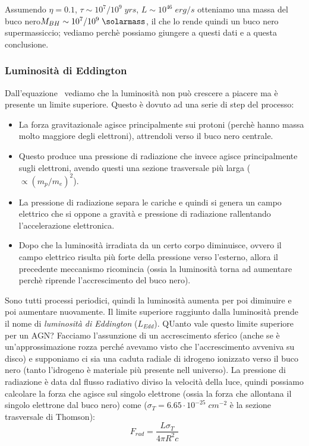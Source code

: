Assumendo $\eta = 0.1$, $\tau \sim 10^7/10^9 \;\si{yrs}$, $L \sim 10^{46} \;\si{erg}/\si{s}$ otteniamo una massa del buco nero$M_{BH} \sim 10^7/10^9 \;\si{\solarmass}$, il che lo rende quindi un buco nero supermassiccio; vediamo perchè possiamo giungere a questi dati e a questa conclusione.

\subsubsection{Luminosità di Eddington}
Dall'equazione~ vediamo che la luminosità non può crescere a piacere ma è presente un limite superiore. Questo è dovuto ad una serie di step del processo:
\begin{itemize}
    \item La forza gravitazionale agisce principalmente sui protoni (perchè hanno massa molto maggiore degli elettroni), attrendoli verso il buco nero centrale.
    \item Questo produce una pressione di radiazione che invece agisce principalmente sugli elettroni, avendo questi una sezione trasversale più larga ($\propto (m_p/m_e)^2$).
    \item La pressione di radiazione separa le cariche e quindi si genera un campo elettrico che si oppone a gravità e pressione di radiazione rallentando l'accelerazione elettronica.
    \item Dopo che la luminosità irradiata da un certo corpo diminuisce, ovvero il campo elettrico risulta più forte della pressione verso l'esterno, allora il precedente meccanismo ricomincia (ossia la luminosità torna ad aumentare perchè riprende l'accrescimento del buco nero).
\end{itemize}
Sono tutti processi periodici, quindi la luminosità aumenta per poi diminuire e poi aumentare nuovamente. Il limite superiore raggiunto dalla luminosità prende il nome di \emph{luminosità di Eddington} ($L_{Edd}$). QUanto vale questo limite superiore per un AGN? Facciamo l'assunzione di un accrescimento sferico (anche se è un’approssimazione rozza perché avevamo visto che l’accrescimento avveniva su disco) e supponiamo ci sia una caduta radiale di idrogeno ionizzato verso il buco nero (tanto l'idrogeno è materiale più presente nell universo). La pressione di radiazione è data dal flusso radiativo diviso la velocità della luce, quindi possiamo calcolare la forza che agisce sul singolo elettrone (ossia la forza che allontana il singolo elettrone dal buco nero) come ($\sigma_T = 6.65 \cdot 10^{-25} \;\si{cm^{-2}}$ è la sezione trasversale di Thomson):
\begin{equation*}
    F_{rad} = \frac{L\sigma_T}{4\pi R^2 c}
\end{equation*}

